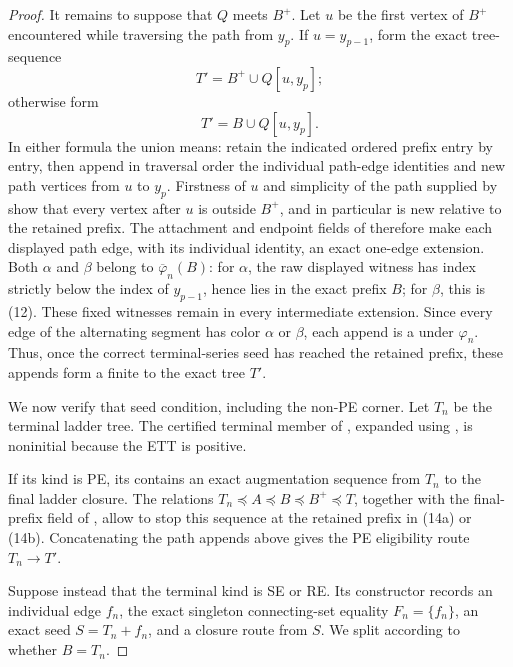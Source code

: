 \begin{proof}
It remains to suppose that \(Q\) meets \(B^+\).  Let \(u\) be the first
vertex of \(B^+\) encountered while traversing the path from \(y_p\).  If
\(u=y_{p-1}\), form the exact tree-sequence
\[
                      T'=B^+\cup Q[u,y_p];                     \tag{14a}
\]
otherwise form
\[
                      T'=B\cup Q[u,y_p].                       \tag{14b}
\]
In either formula the union means: retain the indicated ordered prefix
entry by entry, then append in traversal order the individual path-edge
identities and new path vertices from \(u\) to \(y_p\).  Firstness of \(u\)
and simplicity of the path supplied by
 show that every vertex after
\(u\) is outside \(B^+\), and in particular is new relative to the retained
prefix.  The attachment and endpoint fields of 
therefore make each displayed path edge, with its individual identity, an
exact one-edge extension.  Both \(\alpha\) and \(\beta\) belong to
\(\overline\varphi_n(B)\): for \(\alpha\), the raw displayed witness has
index strictly below the index of \(y_{p-1}\), hence lies in the exact
prefix \(B\); for \(\beta\), this is (12).  These fixed witnesses remain
in every intermediate extension.  Since every edge of the alternating
segment has color \(\alpha\) or \(\beta\), each append is a
 under \(\varphi_n\).  Thus, once the
correct terminal-series seed has reached the retained prefix, these
appends form a finite  to the exact
tree \(T'\).

We now verify that seed condition, including the non-PE corner.  Let
\(T_n\) be the terminal ladder tree.  The certified terminal member of
, expanded using
, is noninitial because the ETT is positive.

If its kind is PE, its  contains an exact
augmentation sequence from \(T_n\) to the final ladder closure.  The
relations \(T_n\preccurlyeq A\preccurlyeq B\preccurlyeq B^+\preccurlyeq
T\), together with the final-prefix field of
, allow
 to stop this sequence at
the retained prefix in (14a) or (14b).  Concatenating the path appends
above gives the PE eligibility route \(T_n\longrightarrow T'\).

Suppose instead that the terminal kind is SE or RE.  Its constructor
records an individual edge \(f_n\), the exact singleton connecting-set
equality \(F_n=\{f_n\}\), an exact
 seed \(S=T_n+f_n\), and a closure route
from \(S\).  We split according to whether \(B=T_n\).


\end{proof}

